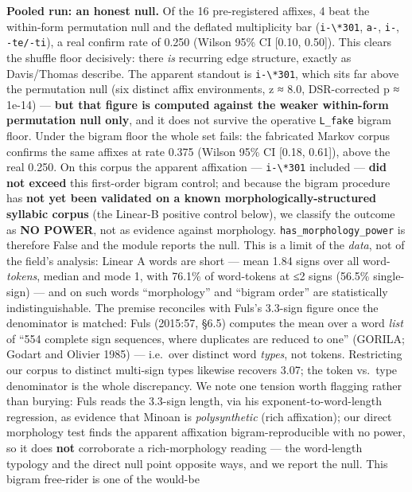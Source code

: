\documentclass[
  10pt,
]{article}
\begin{document}
\textbf{Pooled run: an honest null.} Of the 16 pre-registered affixes, 4
beat the within-form permutation null and the deflated multiplicity bar
(\texttt{i-\textbackslash{}*301}, \texttt{a-}, \texttt{i-},
\texttt{-te/-ti}), a real confirm rate of 0.250 (Wilson 95\% CI {[}0.10,
0.50{]}). This clears the shuffle floor decisively: there \emph{is}
recurring edge structure, exactly as Davis/Thomas describe. The apparent
standout is \texttt{i-\textbackslash{}*301}, which sits far above the
permutation null (six distinct affix environments, z ≈ 8.0,
DSR-corrected p ≈ 1e-14) --- \textbf{but that figure is computed against
the weaker within-form permutation null only}, and it does not survive
the operative \texttt{L\_fake} bigram floor. Under the bigram floor the
whole set fails: the fabricated Markov corpus confirms the same affixes
at rate 0.375 (Wilson 95\% CI {[}0.18, 0.61{]}), above the real 0.250.
On this corpus the apparent affixation ---
\texttt{i-\textbackslash{}*301} included --- \textbf{did not exceed}
this first-order bigram control; and because the bigram procedure has
\textbf{not yet been validated on a known morphologically-structured
syllabic corpus} (the Linear-B positive control below), we classify the
outcome as \textbf{NO POWER}, not as evidence against morphology.
\texttt{has\_morphology\_power} is therefore False and the module
reports the null. This is a limit of the \emph{data}, not of the field's
analysis: Linear A words are short --- mean 1.84 signs over all
word-\emph{tokens}, median and mode 1, with 76.1\% of word-tokens at ≤2
signs (56.5\% single-sign) --- and on such words ``morphology'' and
``bigram order'' are statistically indistinguishable. The premise
reconciles with Fuls's 3.3-sign figure once the denominator is matched:
Fuls (2015:57, §6.5) computes the mean over a word \emph{list} of ``554
complete sign sequences, where duplicates are reduced to one'' (GORILA;
Godart and Olivier 1985) --- i.e.~over distinct word \emph{types}, not
tokens. Restricting our corpus to distinct multi-sign types likewise
recovers 3.07; the token vs.~type denominator is the whole discrepancy.
We note one tension worth flagging rather than burying: Fuls reads the
3.3-sign length, via his exponent-to-word-length regression, as evidence
that Minoan is \emph{polysynthetic} (rich affixation); our direct
morphology test finds the apparent affixation bigram-reproducible with
no power, so it does \textbf{not} corroborate a rich-morphology reading
--- the word-length typology and the direct null point opposite ways,
and we report the null. This bigram free-rider is one of the would-be
\end{document}
